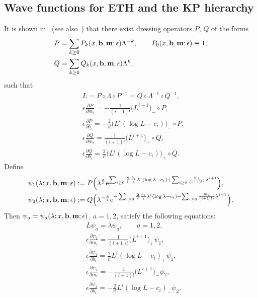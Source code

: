 \documentclass[pdftex]{sigma}
\newcommand{\e}{\epsilon}
\newcommand{\p}{\partial}
\newcommand{\nn}{\nonumber}
\numberwithin{equation}{section}
\begin{document}
\subsection{Wave functions for ETH and the KP hierarchy}
It is shown in~\cite{Carlet} (see also~\cite{CL, Milanov}) that there exist
dressing operators $P$, $Q$ of the forms
\begin{align}
&P= \sum_{k\ge0} P_k(x, {\bf b}, {\bf m};\e) \Lambda^{-k}, \qquad P_0(x, {\bf b}, {\bf m};\e)\equiv 1, \label{CoePk1005}\\
&Q= \sum_{k\ge0} Q_k(x, {\bf b}, {\bf m};\e) \Lambda^k, \label{CoeQk1005}
\end{align}
such that
\begin{align*}
& L=P\circ\Lambda\circ P^{-1}=Q\circ\Lambda^{-1}\circ Q^{-1}, \\
& \e\frac{\p P}{\p m_i} = - \frac1{(i+1)!} \bigl(L^{i+1}\bigr)_- \circ P, \\
& \e\frac{\p P}{\p b_i} = - \frac{2}{i!}\bigl(L^{i}(\log L-c_i)\bigr)_- \circ P,\\
& \e\frac{\p Q}{\p m_i} = \frac1{(i+1)!}\bigl(L^{i+1}\bigr)_+ \circ Q, \\
& \e\frac{\p Q}{\p b_i} = \frac{2}{i!}\bigl(L^{i}(\log L-c_i)\bigr)_+ \circ Q.
\end{align*}
Define
\begin{align*}
& \psi_1(\lambda; x, {\bf b}, {\bf m};\e) :=
P\Bigl(\lambda^{\frac{x}\e} {\rm e}^{\sum_{i\ge0} \frac{2}{i!} \frac{b_i}\e \lambda^i (\log \lambda-c_i)+\sum_{i\ge0} \frac{m_i}{(i+1)!\e} \lambda^{i+1}}\Bigr) , \\
& \psi_2(\lambda; x, {\bf b}, {\bf m};\e) := Q\Bigl(\lambda^{-\frac{x}\e}{\rm e}^{-\sum_{i\ge0} \frac{2}{i!} \frac{b_i}\e \lambda^i (\log \lambda-c_i)-\sum_{i\ge0} \frac{m_i}{(i+1)!\e} \lambda^{i+1}}\Bigr).
\end{align*}
Then $\psi_a=\psi_a(\lambda; x, {\bf b}, {\bf m};\e)$, $a=1,2$, satisfy the following equations:
\begin{align}
& L\psi_a = \lambda \psi_a, \qquad a=1,2, \label{Laxsp1005}\\
& \e \frac{\p \psi_1}{\p m_i} = \frac1{(i+1)!} \bigl(L^{i+1}\bigr)_+ \psi_1,\nn \\
& \e \frac{\p \psi_1}{\p b_i} = \frac{2}{i!} L^i(\log L - c_i)_+ \psi_1, \label{Laxa1bi} \\
& \e \frac{\p \psi_2}{\p m_i} = -\frac1{(i+1)!} \bigl(L^{i+1}\bigr)_- \psi_2,\nn \\
& \e \frac{\p \psi_2}{\p b_i} = -\frac{2}{i!} L^i(\log L - c_i)_- \psi_2. \label{Laxa2bi}
\end{align}
\end{document}

